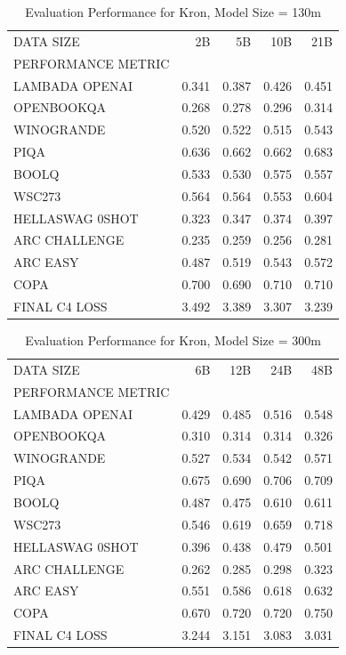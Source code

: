 \begin{table}
[H] \centering \caption{Evaluation Performance for Kron, Model Size = 130m}
\label{tab:eval-performance-kron-130M}
\begin{tabular}{lrrrr}
\toprule
DATA SIZE & 2B & 5B & 10B & 21B \\
PERFORMANCE METRIC &  &  &  &  \\
\midrule
LAMBADA OPENAI & 0.341 & 0.387 & 0.426 & 0.451 \\
OPENBOOKQA & 0.268 & 0.278 & 0.296 & 0.314 \\
WINOGRANDE & 0.520 & 0.522 & 0.515 & 0.543 \\
PIQA & 0.636 & 0.662 & 0.662 & 0.683 \\
BOOLQ & 0.533 & 0.530 & 0.575 & 0.557 \\
WSC273 & 0.564 & 0.564 & 0.553 & 0.604 \\
HELLASWAG 0SHOT & 0.323 & 0.347 & 0.374 & 0.397 \\
ARC CHALLENGE & 0.235 & 0.259 & 0.256 & 0.281 \\
ARC EASY & 0.487 & 0.519 & 0.543 & 0.572 \\
COPA & 0.700 & 0.690 & 0.710 & 0.710 \\
FINAL C4 LOSS & 3.492 & 3.389 & 3.307 & 3.239 \\
\bottomrule
\end{tabular}
\end{table}


\begin{table}
[H] \centering \caption{Evaluation Performance for Kron, Model Size = 300m}
\label{tab:eval-performance-kron-300M}
\begin{tabular}{lrrrr}
\toprule
DATA SIZE & 6B & 12B & 24B & 48B \\
PERFORMANCE METRIC &  &  &  &  \\
\midrule
LAMBADA OPENAI & 0.429 & 0.485 & 0.516 & 0.548 \\
OPENBOOKQA & 0.310 & 0.314 & 0.314 & 0.326 \\
WINOGRANDE & 0.527 & 0.534 & 0.542 & 0.571 \\
PIQA & 0.675 & 0.690 & 0.706 & 0.709 \\
BOOLQ & 0.487 & 0.475 & 0.610 & 0.611 \\
WSC273 & 0.546 & 0.619 & 0.659 & 0.718 \\
HELLASWAG 0SHOT & 0.396 & 0.438 & 0.479 & 0.501 \\
ARC CHALLENGE & 0.262 & 0.285 & 0.298 & 0.323 \\
ARC EASY & 0.551 & 0.586 & 0.618 & 0.632 \\
COPA & 0.670 & 0.720 & 0.720 & 0.750 \\
FINAL C4 LOSS & 3.244 & 3.151 & 3.083 & 3.031 \\
\bottomrule
\end{tabular}
\end{table}


